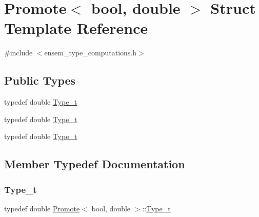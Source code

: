 \hypertarget{structPromote_3_01bool_00_01double_01_4}{}\section{Promote$<$ bool, double $>$ Struct Template Reference}
\label{structPromote_3_01bool_00_01double_01_4}


{\ttfamily \#include $<$ensem\+\_\+type\+\_\+computations.\+h$>$}

\subsection*{Public Types}
\begin{DoxyCompactItemize}
\item 
typedef double \mbox{\hyperlink{structPromote_3_01bool_00_01double_01_4_a89d90c1b19975ea58462741364f3d29e}{Type\+\_\+t}}
\item 
typedef double \mbox{\hyperlink{structPromote_3_01bool_00_01double_01_4_a89d90c1b19975ea58462741364f3d29e}{Type\+\_\+t}}
\item 
typedef double \mbox{\hyperlink{structPromote_3_01bool_00_01double_01_4_a89d90c1b19975ea58462741364f3d29e}{Type\+\_\+t}}
\end{DoxyCompactItemize}


\subsection{Member Typedef Documentation}
\mbox{\label{structPromote_3_01bool_00_01double_01_4_a89d90c1b19975ea58462741364f3d29e}} 
\subsubsection{\texorpdfstring{Type\_t}{Type\_t}\hspace{0.1cm}{\footnotesize\ttfamily [1/3]}}
{\footnotesize\ttfamily typedef double \mbox{\hyperlink{structPromote}{Promote}}$<$ bool, double $>$\+::\mbox{\hyperlink{structPromote_3_01bool_00_01double_01_4_a89d90c1b19975ea58462741364f3d29e}{Type\+\_\+t}}}

\mbox{\label{structPromote_3_01bool_00_01double_01_4_a89d90c1b19975ea58462741364f3d29e}} 
